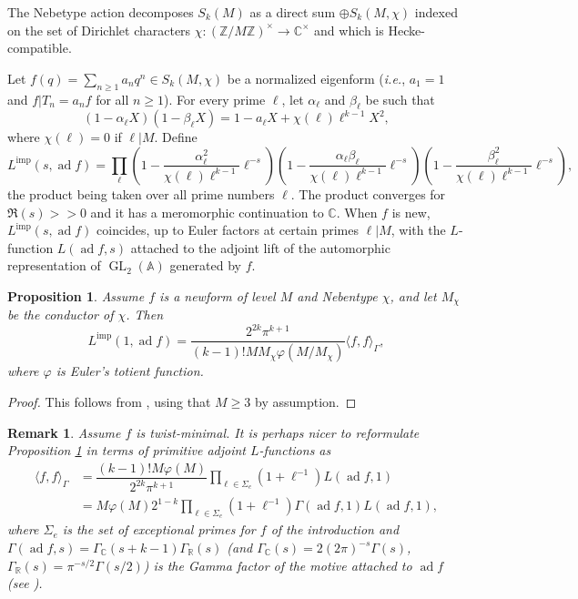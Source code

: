 \documentclass[12pt]{amsart}
\newcommand\bA{\mathbb{A}}
\newcommand\bR{\mathbb{R}}
\newcommand\bC{\mathbb{C}}
\newcommand\bZ{\mathbb{Z}}
\DeclareMathOperator{\ad}{ad}
\DeclareMathOperator{\GL}{GL}
\theoremstyle{defstyle}
\newtheorem{remark}[subsubsection]{Remark}
\theoremstyle{thmstyle}
\newtheorem{proposition}[subsubsection]{Proposition}
\begin{document}
 The Nebetype action decomposes $S_k(M)$ as a direct sum $\oplus S_k(M,\chi)$ indexed on the set of Dirichlet characters $\chi \colon (\bZ/M\bZ)^\times \to \bC^\times$ and which is Hecke-compatible. 
  
 Let $f(q)=\sum_{n\geq 1} a_n q^n\in S_k(M,\chi)$ be a normalized eigenform (\textit{i.e.}, $a_1=1$ and $f|T_n=a_nf$ for all $n\geq 1$). For every prime $\ell$, let $\alpha_\ell$ and $\beta_\ell$ be such that 
 \[(1-\alpha_\ell X)(1-\beta_\ell X)=1-a_\ell X + \chi(\ell)\ell^{k-1} X^2,\] 
where $\chi(\ell)=0$ if $\ell |M$. Define 
\small\[L^\text{imp}(s,\ad f)=\prod_\ell  (1-\frac{\alpha_\ell^2}{\chi(\ell)\ell^{k-1}}\ell^{-s})(1-\frac{\alpha_\ell\beta_\ell}{\chi(\ell)\ell^{k-1}}\ell^{-s})(1-\frac{\beta_\ell^2}{\chi(\ell)\ell^{k-1}}\ell^{-s}),\]\normalsize
the product being taken over all prime numbers $\ell$. The product converges for $\Re(s)>>0$ and it has a meromorphic continuation to $\bC$.  When $f$ is new, $L^\textrm{imp}(s,\ad f)$ coincides, up to Euler factors at certain primes $\ell|M$, with the $L$-function $L(\ad f,s)$ attached to the adjoint lift of the automorphic representation of $\GL_2(\bA)$ generated by $f$.
\begin{proposition}\label{prop:formula_Hida_imprimitive_L}
	Assume $f$ is a newform of level $M$ and Nebentype $\chi$, and let $M_\chi$ be the conductor of $\chi$. Then
	\[L^\text{imp}(1,\ad f)= \frac{2^{2k}\pi^{k+1}}{(k-1)!MM_\chi\varphi(M/M_\chi)} \langle f,f \rangle_\Gamma,\]
	where $\varphi$ is Euler's totient function.
\end{proposition}
\begin{proof}
	This follows from \cite[Thm. 5.1]{hida1981inventiones}, using that $M\geq 3$ by assumption.
\end{proof}
\begin{remark}
	Assume $f$ is twist-minimal. It is perhaps nicer to reformulate Proposition \ref{prop:formula_Hida_imprimitive_L} in terms of primitive adjoint $L$-functions as
	\begin{align*}
		\langle f,f \rangle_\Gamma &= \dfrac{(k-1)!M\varphi(M)}{2^{2k}\pi^{k+1}} \prod_{\ell\in\Sigma_e}(1+\ell^{-1}) L(\ad f,1) \\
							&=M\varphi(M)2^{1-k} \prod_{\ell\in\Sigma_e}(1+\ell^{-1}) \Gamma(\ad f,1) L(\ad f,1),
	\end{align*}
	where $\Sigma_e$ is the set of exceptional primes for $f$ of the introduction and $\Gamma(\ad f,s)=\Gamma_\bC(s+k-1)\Gamma_\bR(s)$ (and $\Gamma_\bC(s)=2(2\pi)^{-s}\Gamma(s)$, $\Gamma_\bR(s)=\pi^{-s/2}\Gamma(s/2)$) is the Gamma factor of the motive attached to $\ad f$ (see \cite[Lemma 2.12]{DFG}).
\end{remark}
\end{document}
